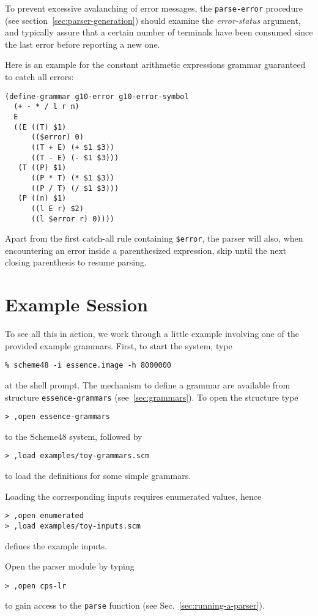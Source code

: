 \documentclass{article}
\renewcommand{\var}[1]{\noindent\mbox{\textit{#1}}}
\newcommand{\codefont}[1]{\texttt{#1}}
\begin{document}
To prevent excessive avalanching of error messages, the
\codefont{parse-error} procedure (see
section~\ref{sec:parser-generation}) should examine the
\var{error-status} argument, and typically assure that a certain
number of terminals have been consumed since the last error before
reporting a new one.

Here is an example for the constant arithmetic expressions grammar
guaranteed to catch all errors:
%
\begin{verbatim}
(define-grammar g10-error g10-error-symbol
  (+ - * / l r n)
  E
  ((E ((T) $1)
      (($error) 0)
      ((T + E) (+ $1 $3))
      ((T - E) (- $1 $3)))
   (T ((P) $1)
      ((P * T) (* $1 $3))
      ((P / T) (/ $1 $3)))
   (P ((n) $1)
      ((l E r) $2)
      ((l $error r) 0))))
\end{verbatim}
%
Apart from the first catch-all rule containing \codefont{\$error}, the
parser will also, when encountering an error inside a parenthesized
expression, skip until the next closing parenthesis to resume parsing.


\section{Example Session}
\label{sec:example-session}

To see all this in action, we work through a little example involving one of
the provided example grammars. First, to start the system, type
\begin{verbatim}
% scheme48 -i essence.image -h 8000000
\end{verbatim}
at the shell prompt. The mechanism to define a grammar are available from
structure \codefont{essence-grammars} (see~\ref{sec:grammars}). To open the structure
type
\begin{verbatim}
> ,open essence-grammars
\end{verbatim}
to the Scheme48 system, followed by
\begin{verbatim}
> ,load examples/toy-grammars.scm
\end{verbatim}
to load the definitions for some simple grammars.

Loading the corresponding inputs requires enumerated values, hence
\begin{verbatim}
> ,open enumerated
> ,load examples/toy-inputs.scm
\end{verbatim}
defines the example inputs.

Open the parser module by typing
\begin{verbatim}
> ,open cps-lr
\end{verbatim}
to gain access to the \codefont{parse}
function (see Sec.~\ref{sec:running-a-parser}). 
\end{document}
